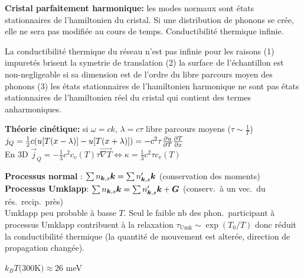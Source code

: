 \begin{squishlist}
    \item \textbf{Cristal parfaitement harmonique:} les modes normaux sont états stationnaires de l'hamiltonien du cristal. Si une distribution de phonons se crée, elle ne sera pas modifiée au cours de temps. Conductibilité thermique infinie.
    \item La conductibilité thermique du réseau n'est pas infinie pour les raisons
    (1) impuretés brisent la symetrie de translation (2) la surface de l'échantillon est non-negligeable si sa dimension est de l'ordre du libre parcours moyen des phonons (3) les états stationnaires de l’hamiltonien harmonique ne sont pas états stationnaires de l’hamiltonien réel du cristal qui contient des termes anharmoniques.
    \item \textbf{Théorie cinétique:} si $\omega = ck$, $\lambda = c \tau$ libre parcours moyens ($\tau \sim \frac{1}{T}$) \\ $j_Q = \frac{1}{2}c (u[T(x-\lambda)] - u[T(x+\lambda)]) = - c^2 \tau \D{T}{u}\D{x}{T}$ \\
    En 3D $\vec{j}_Q = - \frac{1}{3}c^2 c_v(T) \tau \vec{\nabla T} \Longleftrightarrow \kappa = \frac{1}{3} c^2 \tau c_v(T)$
    \item \textbf{Processus normal} : $\sum n_{\vk,s}\vk = \sum n'_{\vk, s}\vk$ (conservation des moments) \\
    \textbf{Processus Umklapp}:  $\sum n_{\vk,s}\vk = \sum n'_{\vk, s}\vk + \vG$ (conserv.\ à un vec.\ du rés.\ recip.\ près) \\
    Umklapp peu probable à basse $T$. Seul le faible nb des phon.\ participant à  processus Umklapp contribuent à la relaxation $\tau_{\text{Umk}} \sim \exp(T_0/T)$ donc réduit la conductibilité thermique (la quantité de mouvement est alterée, direction de propagation changée).
\end{squishlist}

\begin{squishlist}
    \item $k_B T (300$K$) \approx 26$ meV
\end{squishlist}

\columnbreak

